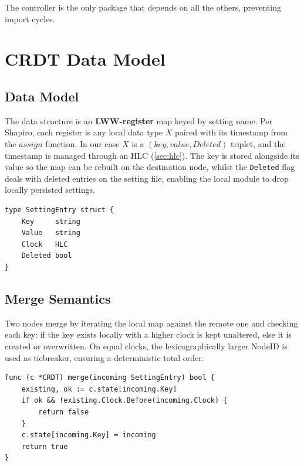 \documentclass[conference]{IEEEtran}
\begin{document}
The controller is the only package that depends on all the others, preventing import cycles.

\section{CRDT Data Model}
\label{sec:crdt}

\subsection{Data Model}

{\color{violet}The data structure is an \textbf{LWW-register}\cite{shapiro2011} map keyed by setting name.
  Per Shapiro, each register is any local data type $X$ paired with its timestamp from the $assign$ function.
  In our case $X$ is a $(key, value, Deleted)$ triplet, and the timestamp is managed through an HLC (\autoref{sec:hlc}).
  The key is stored alongside its value so the map can be rebuilt on the destination node, whilst the \texttt{Deleted} flag deals with
  deleted entries on the setting file, enabling the local module to drop locally persisted settings.
}

\begin{lstlisting}
type SettingEntry struct {
    Key     string
    Value   string
    Clock   HLC
    Deleted bool
}
\end{lstlisting}

\subsection{Merge Semantics}
\label{merge-semantics}

Two nodes merge by iterating {\color{violet}the local map against the remote one and checking each key:
if the key exists locally with a higher clock is kept unaltered, else it is created or overwritten.}
On equal clocks, the lexicographically larger NodeID is used as tiebreaker,
ensuring a deterministic total order.

\begin{lstlisting}
func (c *CRDT) merge(incoming SettingEntry) bool {
    existing, ok := c.state[incoming.Key]
    if ok && !existing.Clock.Before(incoming.Clock) {
        return false
    }
    c.state[incoming.Key] = incoming
    return true
}
\end{lstlisting}
\end{document}
